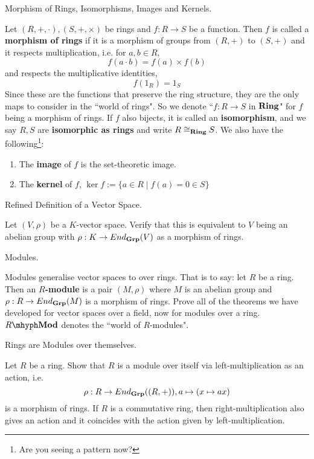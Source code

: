 \documentclass[../book.tex]{subfiles}
\begin{document}
\begin{dfn} Morphism of Rings, Isomorphisms, Images and Kernels. 

    Let $(R,+,\cdot), (S,+,\times)$ be rings and $f : R \to S$ be a function. 
    Then $f$ is called a \textbf{morphism of rings} if 
    it is a morphism of groups from $(R,+)$ to $(S,+)$ and
    it respects multiplication, i.e. for $a, b \in R$, 
    \[f(a \cdot b) = f(a) \times f(b)\]
    and respects the multiplicative identities, 
    \[f(1_R) = 1_S\]
    Since these are the functions that preserve the ring structure, 
    they are the only maps to consider in the ``world of rings".
    So we denote ``$f : R \to S$ in $\mathbf{Ring}$" for $f$ being a morphism of rings. 
    If $f$ also bijects, it is called an \textbf{isomorphism}, and 
    we say $R, S$ are \textbf{isomorphic as rings}
    and write $R \cong_{\mathbf{Ring}} S$. 
    We also have the following\footnote{
    Are you seeing a pattern now?}: 
    \begin{enumerate}
        \item The \textbf{image} of $f$ is the set-theoretic image. 
        \item The \textbf{kernel} of $f$, 
        $\ker f := \{a \in R \mid f(a) = 0 \in S\}$
    \end{enumerate}
\end{dfn}

\begin{ex} [Important] Refined Definition of a Vector Space.

    Let $(V,\rho)$ be a $K$-vector space. 
    Verify that this is equivalent to $V$ being an abelian group
    with $\rho : K \to End_{\mathbf{Grp}}(V)$ as a morphism of rings. 
\end{ex}

\begin{ex} [Important] Modules. 

    Modules generalise vector spaces to over rings.
    That is to say: let $R$ be a ring. 
    Then an \textbf{$R$-module} is a pair $(M,\rho)$ where
    $M$ is an abelian group and $\rho : R \to End_{\mathbf{Grp}}(M)$ is a morphism of rings. 
    Prove all of the theorems we have developed for vector spaces over a field, 
    now for modules over a ring. 
    $\RMod$ denotes the ``world of $R$-modules". 
\end{ex}

\begin{ex} [Important] Rings are Modules over themselves.

    Let $R$ be a ring. 
    Show that $R$ is a module over itself via left-multiplication as an action,
    i.e. \[
        \rho : R \to End_{\mathbf{Grp}}((R,+)), a \mapsto (x \mapsto ax)
    \]
    is a morphism of rings. 
    If $R$ is a commutative ring, 
    then right-multiplication also gives an action and
    it coincides with the action given by left-multiplication. 
\end{ex}
\end{document}
